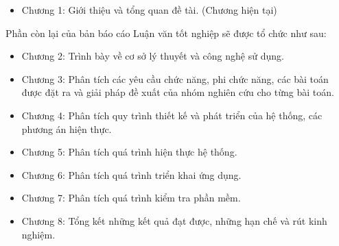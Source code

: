 \begin{itemize}
  \item Chương 1: Giới thiệu và tổng quan đề tài. (Chương hiện tại)
\end{itemize}
Phần còn lại của bản báo cáo Luận văn tốt nghiệp sẽ được tổ chức như sau:
\begin{itemize}
  \item Chương 2: Trình bày về cơ sở lý thuyết và công nghệ sử dụng.
  \item Chương 3: Phân tích các yêu cầu chức năng, phi chức năng, các bài toán được đặt ra và giải pháp đề xuất của nhóm nghiên cứu cho từng bài toán.
  \item Chương 4: Phân tích quy trình thiết kế và phát triển của hệ thống, các phương án hiện thực.
  \item Chương 5: Phân tích quá trình hiện thực hệ thống.
  \item Chương 6: Phân tích quá trình triển khai ứng dụng.
  \item Chương 7: Phân tích quá trình kiểm tra phần mềm.
  \item Chương 8: Tổng kết những kết quả đạt được, những hạn chế và rút kinh nghiệm.
\end{itemize}